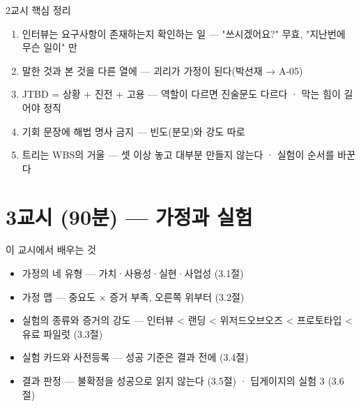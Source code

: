 \begin{frame}{2교시 핵심 정리}
\begin{enumerate}
\item 인터뷰는 요구사항이 존재하는지 확인하는 일 — "쓰시겠어요?" 무효, "지난번에 무슨 일이" 만
\item 말한 것과 본 것을 다른 열에 — 괴리가 가정이 된다(박선재 → A-05)
\item JTBD = 상황 + 진전 + 고용 — 역할이 다르면 진술문도 다르다 · 막는 힘이 길어야 정직
\item 기회 문장에 해법 명사 금지 — 빈도(분모)와 강도 따로
\item 트리는 WBS의 거울 — 셋 이상 놓고 대부분 만들지 않는다 · 실험이 순서를 바꾼다
\end{enumerate}
\end{frame}

\section{3교시 (90분) — 가정과 실험}
\begin{frame}{이 교시에서 배우는 것}
\begin{itemize}
\item 가정의 네 유형 — 가치·사용성·실현·사업성 (3.1절)
\item 가정 맵 — 중요도 × 증거 부족, 오른쪽 위부터 (3.2절)
\item 실험의 종류와 증거의 강도 — 인터뷰 < 랜딩 < 위저드오브오즈 < 프로토타입 < 유료 파일럿 (3.3절)
\item 실험 카드와 사전등록 — 성공 기준은 결과 전에 (3.4절)
\item 결과 판정 — 불확정을 성공으로 읽지 않는다 (3.5절) · 딥게이지의 실험 3 (3.6절)
\end{itemize}
\end{frame}

